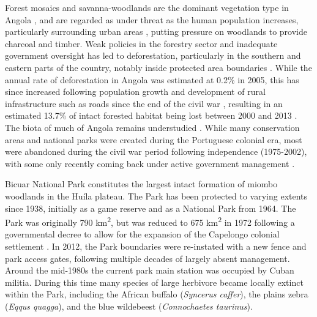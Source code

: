 \begin{refsection}
Forest mosaics and savanna-woodlands are the dominant vegetation type in Angola \citep{White1983}, and are regarded as under threat as the human population increases, particularly surrounding urban areas \citep{Ritchie2018}, putting pressure on woodlands to provide charcoal and timber. Weak policies in the forestry sector and inadequate government oversight has led to deforestation, particularly in the southern and eastern parts of the country, notably inside protected area boundaries \citep{FAO2015, Mendelsohn2019}. While the annual rate of deforestation in Angola was estimated at 0.2\% in 2005, this has since increased following population growth and development of rural infrastructure such as roads since the end of the civil war \citep{Roder2015}, resulting in an estimated 13.7\% of intact forested habitat being lost between 2000 and 2013 \citep{Potapov2017, Hansen2013}. The biota of much of Angola remains understudied \citep{Huntley2019}. While many conservation areas and national parks were created during the Portuguese colonial era, most were abandoned during the civil war period following independence (1975-2002), with some only recently coming back under active government management \citep{Huntley2019, Ministerio2006}.

Bicuar National Park constitutes the largest intact formation of miombo woodlands in the Hu\'{i}la plateau. The Park has been protected to varying extents since 1938, initially as a game reserve and as a National Park from 1964. The Park was originally 790 km\textsuperscript{2}, but was reduced to \textapprox{}675 km\textsuperscript{2} in 1972 following a governmental decree to allow for the expansion of the Capelongo colonial settlement \citep{Mendelsohn2019}. In 2012, the Park boundaries were re-instated with a new fence and park access gates, following multiple decades of largely absent management. Around the mid-1980s the current park main station was occupied by Cuban militia. During this time many species of large herbivore became locally extinct within the Park, including the African buffalo (\textit{Syncerus caffer}), the plains zebra (\textit{Eqqus quagga}), and the blue wildebeest (\textit{Connochaetes taurinus}).


\end{refsection}
